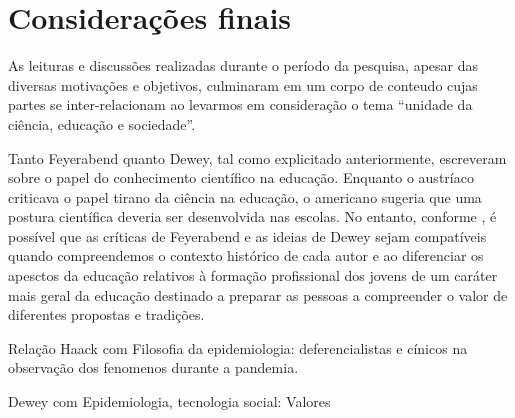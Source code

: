 \documentclass[12pt]{report}
\begin{document}
	

	\vspace*{-0.6cm}
	\chapter*{Considerações finais}
	\vspace*{-0.75cm}
	
	As leituras e discussões realizadas durante o período da pesquisa, apesar das diversas motivações e objetivos, culminaram em um corpo de conteudo cujas partes se inter-relacionam ao levarmos em consideração o tema ``unidade da ciência, educação e sociedade''.
	
	Tanto Feyerabend quanto Dewey, tal como explicitado anteriormente, escreveram sobre o papel do conhecimento científico na educação.
	Enquanto o austríaco criticava o papel tirano da ciência na educação, o americano sugeria que uma postura científica deveria ser desenvolvida nas escolas.
	No entanto, conforme \textcite{cunha_sci_and_edu}, é possível que as críticas de Feyerabend e as ideias de Dewey sejam compatíveis quando compreendemos o contexto histórico de cada autor e ao diferenciar os apesctos da educação relativos à formação profissional dos jovens de um caráter mais geral da educação destinado a preparar as pessoas a compreender o valor de diferentes propostas e tradições.
	
	
	
	Relação Haack com Filosofia da epidemiologia: deferencialistas e cínicos na observação dos fenomenos durante a pandemia.
	
	Dewey com Epidemiologia, tecnologia social: Valores
	\newpage
	\vspace*{-3cm}
	\printbibliography
	
\end{document}
